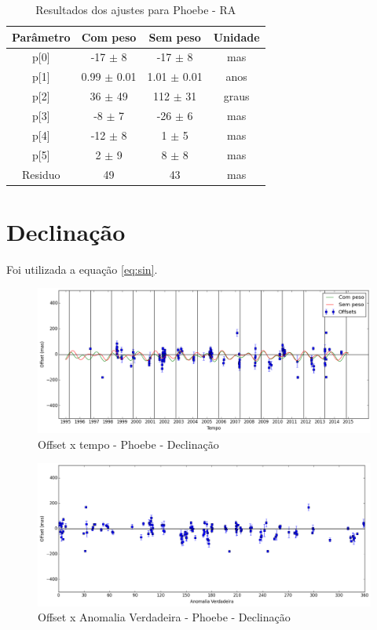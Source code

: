 \documentclass[11pt,a4paper]{report}
\begin{document}
\begin{table}[h!]
\caption{\label{Tab: Phoebe-RA} Resultados dos ajustes para Phoebe - RA}
\begin{centering}
\begin{tabular}{cccc}
\hline
\hline
Parâmetro & Com peso & Sem peso & Unidade\tabularnewline
\hline
p[0] & -17 $\pm$ 8 & -17 $\pm$ 8 & mas\\
p[1] & 0.99 $\pm$ 0.01 & 1.01 $\pm$ 0.01 & anos\\
p[2] & 36 $\pm$ 49 & 112 $\pm$ 31 & graus\\
p[3] & -8 $\pm$ 7 & -26 $\pm$ 6 & mas\\
p[4] & -12 $\pm$ 8 & 1 $\pm$ 5 & mas\\
p[5] & 2 $\pm$ 9 & 8 $\pm$ 8 & mas\\
Residuo & 49 & 43 & mas\\
\hline 
\end{tabular} 
\par\end{centering}
\end{table}

\section*{Declinação}

Foi utilizada a equação \ref{eq:sin}.

\begin{figure}[h]
\caption{Offset x tempo - Phoebe - Declinação}
\includegraphics[scale=0.45]{Phoebe/DEC.png} 
\end{figure}

\begin{figure}[h]
\caption{Offset x Anomalia Verdadeira - Phoebe - Declinação}
\includegraphics[scale=0.45]{Phoebe/DEC_anom.png}  
\end{figure}
\end{document}
